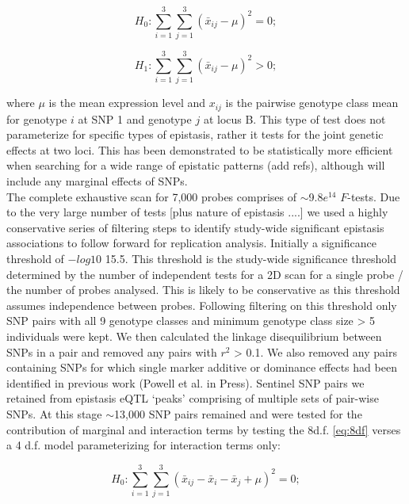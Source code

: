 \documentclass{article}
\begin{document}
\begin{equation}
H _0 : \sum _{i=1} ^3 \sum _{j=1} ^3 (\bar x _{ij} - \mu) ^2 = 0; 
\end{equation}

\begin{equation}
H _1 : \sum _{i=1} ^3 \sum _{j=1} ^3 (\bar x _{ij} - \mu) ^2 > 0; 
\label{eq:8df}
\end{equation}

where $\mu$ is the mean expression level and $x _{ij}$ is the pairwise genotype class mean for genotype $i$ at SNP 1 and genotype $j$ at locus B. This type of test does not parameterize for specific types of epistasis, rather it tests for the joint genetic effects at two loci. This has been demonstrated to be statistically more efficient when searching for a wide range of epistatic patterns (add refs), although will include any marginal effects of SNPs. \\[0.2cm]
 
The complete exhaustive scan for 7,000 probes comprises of $\sim$9.8$e^{14}$ $F$-tests. Due to the very large number of tests [plus nature of epistasis ....] we used a highly conservative series of filtering steps to identify study-wide significant epistasis associations to follow forward for replication analysis. Initially a significance threshold of $-log10$ 15.5. This threshold is the study-wide significance threshold determined by the number of independent tests for a 2D scan for a single probe / the number of probes analysed. This is likely to be conservative as this threshold assumes independence between probes. Following filtering on this threshold only SNP pairs with all 9 genotype classes and minimum genotype class size > 5 individuals were kept. We then calculated the linkage disequilibrium between SNPs in a pair and removed any pairs with $r^2$ > 0.1. We also removed any pairs containing SNPs for which single marker additive or dominance effects had been identified  in previous work (Powell et al. in Press). Sentinel  SNP pairs we retained from epistasis eQTL `peaks' comprising of multiple sets of pair-wise SNPs. At this stage $\sim$13,000 SNP pairs remained and were tested for the contribution of marginal and interaction terms by testing the 8d.f. \ref{eq:8df} verses a 4 d.f. model parameterizing for interaction terms only:

\begin{equation}
H _0: \sum _{i=1} ^3 \sum _{j=1} ^3 (\bar x _{ij} - \bar x _i - \bar x _j + \mu) ^2 = 0;
\end{equation}
\end{document}
